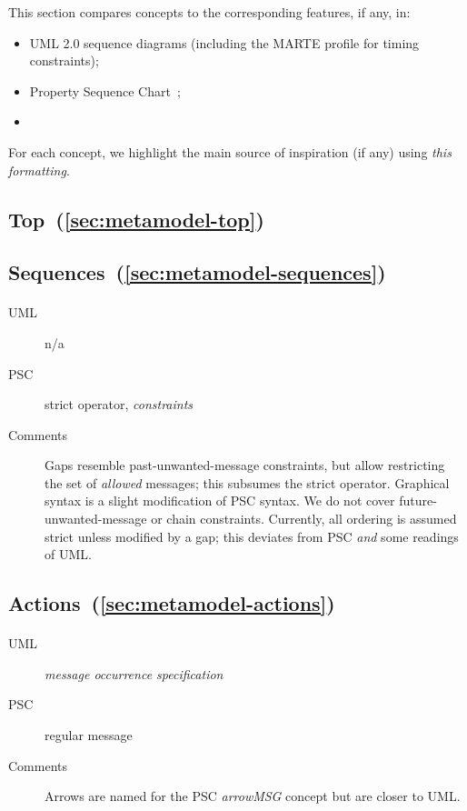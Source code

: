 \newcommand{\insp}[1]{\textsl{#1}}

This section compares \langname{} concepts to the
corresponding features, if any, in:

\begin{itemize}
\item
  UML 2.0 sequence diagrams (including the MARTE profile for timing
  constraints);
\item
  Property Sequence Chart~\cite{psc};
\item
\end{itemize}

For each concept, we highlight the main source of inspiration (if any)
using \insp{this formatting}.

\subsection{Top~(\ref{sec:metamodel-top})}

\subsection{Sequences~(\ref{sec:metamodel-sequences})}

\paragraph{\msequencegap}
\begin{description}
\item[UML] n/a
\item[PSC] strict operator, \insp{constraints}
\item[Comments]
  Gaps resemble past-unwanted-message constraints, but
  allow restricting the set of \emph{allowed} messages;
  this subsumes the strict operator.  Graphical syntax is a slight
  modification of PSC syntax.  We do not cover
  future-unwanted-message or chain constraints.  Currently, all
  ordering is assumed strict unless modified by a gap; this
  deviates from PSC \emph{and} some readings of UML.
\end{description}
    
\subsection{Actions~(\ref{sec:metamodel-actions})}

\paragraph{\marrowaction}
\begin{description}
\item[UML] \insp{message occurrence specification}
\item[PSC] regular message
\item[Comments]
  Arrows are named for the PSC \emph{arrowMSG} concept but are closer
  to UML.
\end{description}

